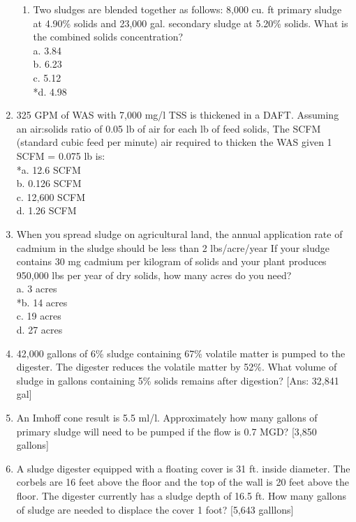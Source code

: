 \begin{enumerate}
\begin{enumerate}
\item Two sludges are blended together as follows: 8,000 cu. ft primary sludge at 4.90\% solids and 23,000 gal. secondary sludge at 5.20\% solids. What is the combined solids concentration?\\
a. 3.84\\ 
b. 6.23 \\
c. 5.12 \\
*d. 4.98 \\

\end{enumerate}

\item 325 GPM of WAS with 7,000 mg/l TSS is thickened in a DAFT. Assuming an air:solids ratio of 0.05 lb of air for each lb of feed solids, The SCFM (standard cubic feed per minute) air required to thicken the WAS given 1 SCFM = 0.075 lb is: \\

*a. 12.6 SCFM \\
b. 0.126 SCFM \\
c. 12,600 SCFM \\
d. 1.26 SCFM \\

\item When you spread sludge on agricultural land, the annual application rate of cadmium in the sludge should be less than 2 lbs/acre/year If your sludge contains 30 mg cadmium per kilogram of solids and your plant produces 950,000 lbs per year of dry solids, how many acres do you need? \\

a. 3 acres\\
*b. 14 acres \\
c. 19 acres \\
d. 27 acres \\

\item 42,000 gallons of 6\% sludge containing 67\% volatile matter is pumped to the digester.  The digester reduces the volatile matter by 52\%.  What volume of sludge in gallons containing 5\% solids remains after digestion? [Ans:  32,841 gal]

\item An Imhoff cone result is 5.5 ml/l.  Approximately how many gallons of primary sludge will need to be pumped if the flow is 0.7 MGD? [3,850 gallons]

\item A sludge digester equipped with a floating cover is 31 ft. inside diameter.  The corbels are 16 feet above the floor and the top of the wall is 20 feet above the floor.  The digester currently has a sludge depth of 16.5 ft. How many gallons of sludge are needed to displace the cover 1 foot? [5,643 galllons]


\end{enumerate}
